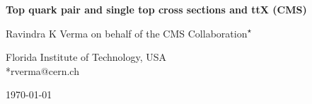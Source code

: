 
\newcommand{\Pmu}{\ensuremath{{\PGm}}\xspace}
\newcommand{\pzvar}{\ensuremath{p_\text{Z}(\Pepm, \PGmmp, j)}\xspace}
\newcommand{\invmassvar}{\ensuremath{m(\Pepm, \PGmmp,j)}\xspace}
\newcommand{\transmassvar}{\ensuremath{m_{\text{T}}(\Pepm, \PGmmp,j,\ptmiss)}\xspace}
\newcommand{\deltaPhiVar}{\ensuremath{\Delta\varphi(\Pepm, \PGmmp)}\xspace}
\newcommand{\ljets}{\ensuremath{\ell + \text{jets}}\xspace}
\newcommand{\dilep}{\ensuremath{2\ell + \text{jets}}\xspace}
\newcommand{\ttjets}{\ensuremath{\ttbar + \text{jets}}\xspace}
\newcommand{\ttgamma}{\ensuremath{\ttbar\gamma}\xspace}
\newcommand{\cc}{\ensuremath{\PQc\PAQc}\xspace}
\newcommand{\bb}{\ensuremath{\PQb\PAQb}\xspace}
\newcommand{\ttcc}{\ensuremath{\ttbar\PQc\PAQc}\xspace}
\newcommand{\ttcL}{\ensuremath{\ttbar\PQc\text{L}}\xspace}
\newcommand{\ttbb}{\ensuremath{\ttbar\PQb\PAQb}\xspace}
\newcommand{\ttbL}{\ensuremath{\ttbar\PQb\text{L}}\xspace}
\newcommand{\ttLF}{\ensuremath{\ttbar\text{LL}}\xspace}
\newcommand{\ttjj}{\ensuremath{\ttbar\text{jj}}\xspace}
\newcommand{\mujets}{\ensuremath{\PGm + \text{jets}}\xspace}
\newcommand{\ejets}{\ensuremath{\Pe + \text{jets}}\xspace}
\newcommand{\tW}{\ensuremath{\PQt\PW}\xspace}






\begin{center}{\Large \textbf{
            Top quark pair and single top cross sections and ttX (CMS)\\
}}\end{center}
\begin{center}
Ravindra K Verma on behalf of the CMS Collaboration\textsuperscript{$\star$} 
\end{center}
\begin{center}
Florida Institute of Technology, USA 
\\
*rverma@cern.ch 
\end{center}
\begin{center}
\today
\end{center}

